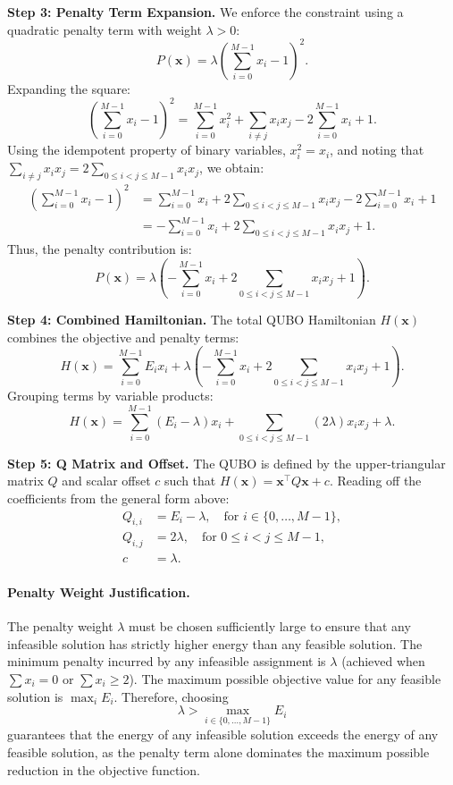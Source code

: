 \documentclass[12pt]{article}
\begin{document}
\textbf{Step 3: Penalty Term Expansion.}
We enforce the constraint using a quadratic penalty term with weight $\lambda > 0$:
\[
P(\mathbf{x}) = \lambda \left( \sum_{i=0}^{M-1} x_i - 1 \right)^2.
\]
Expanding the square:
\[
\left( \sum_{i=0}^{M-1} x_i - 1 \right)^2 = \sum_{i=0}^{M-1} x_i^2 + \sum_{i \neq j} x_i x_j - 2 \sum_{i=0}^{M-1} x_i + 1.
\]
Using the idempotent property of binary variables, $x_i^2 = x_i$, and noting that $\sum_{i \neq j} x_i x_j = 2 \sum_{0 \le i < j \le M-1} x_i x_j$, we obtain:
\[
\begin{aligned}
\left( \sum_{i=0}^{M-1} x_i - 1 \right)^2 &= \sum_{i=0}^{M-1} x_i + 2 \sum_{0 \le i < j \le M-1} x_i x_j - 2 \sum_{i=0}^{M-1} x_i + 1 \\
&= -\sum_{i=0}^{M-1} x_i + 2 \sum_{0 \le i < j \le M-1} x_i x_j + 1.
\end{aligned}
\]
Thus, the penalty contribution is:
\[
P(\mathbf{x}) = \lambda \left( -\sum_{i=0}^{M-1} x_i + 2 \sum_{0 \le i < j \le M-1} x_i x_j + 1 \right).
\]

\textbf{Step 4: Combined Hamiltonian.}
The total QUBO Hamiltonian $H(\mathbf{x})$ combines the objective and penalty terms:
\[
H(\mathbf{x}) = \sum_{i=0}^{M-1} E_i x_i + \lambda \left( -\sum_{i=0}^{M-1} x_i + 2 \sum_{0 \le i < j \le M-1} x_i x_j + 1 \right).
\]
Grouping terms by variable products:
\[
H(\mathbf{x}) = \sum_{i=0}^{M-1} (E_i - \lambda) x_i + \sum_{0 \le i < j \le M-1} (2\lambda) x_i x_j + \lambda.
\]

\textbf{Step 5: Q Matrix and Offset.}
The QUBO is defined by the upper-triangular matrix $Q$ and scalar offset $c$ such that $H(\mathbf{x}) = \mathbf{x}^\top Q \mathbf{x} + c$. Reading off the coefficients from the general form above:
\begin{align}
Q_{i,i} &= E_i - \lambda, \quad \text{for } i \in \{0, \dots, M-1\}, \\
Q_{i,j} &= 2\lambda, \quad \text{for } 0 \le i < j \le M-1, \\
c &= \lambda.
\end{align}

\paragraph{Penalty Weight Justification.}
The penalty weight $\lambda$ must be chosen sufficiently large to ensure that any infeasible solution has strictly higher energy than any feasible solution. The minimum penalty incurred by any infeasible assignment is $\lambda$ (achieved when $\sum x_i = 0$ or $\sum x_i \ge 2$). The maximum possible objective value for any feasible solution is $\max_i E_i$. Therefore, choosing
\[
\lambda > \max_{i \in \{0, \dots, M-1\}} E_i
\]
guarantees that the energy of any infeasible solution exceeds the energy of any feasible solution, as the penalty term alone dominates the maximum possible reduction in the objective function.
\end{document}
